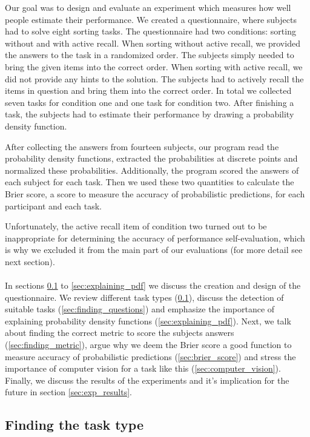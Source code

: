 \documentclass[../main/main.tex]{subfiles}
\begin{document}
	
	\noindent Our goal was to design and evaluate an experiment which measures how well people estimate their performance. We created a questionnaire, where subjects had to solve eight sorting tasks. The questionnaire had two conditions: sorting without and with active recall. When sorting without active recall, we provided the answers to the task in a randomized order. The subjects simply needed to bring the given items into the correct order. When sorting with active recall, we did not provide any hints to the solution. The subjects had to actively recall the items in question and bring them into the correct order. In total we collected seven tasks for condition one and one task for condition two. After finishing a task, the subjects had to estimate their performance by drawing a probability density function. 
	
	After collecting the answers from fourteen subjects, our program read the probability density functions, extracted the probabilities at discrete points and normalized these probabilities. Additionally, the program scored the answers of each subject for each task. Then we used these two quantities to calculate the Brier score, a score to measure the accuracy of probabilistic predictions, for each participant and each task.
	
	Unfortunately, the active recall item of condition two turned out to be inappropriate for determining the accuracy of performance self-evaluation, which is why we excluded it from the main part of our evaluations (for more detail see next section).
	\\\\
	In sections \ref{sec:finding_task_type} to \ref{sec:explaining_pdf} we discuss the creation and design of the questionnaire. We review different task types (\ref{sec:finding_task_type}), discuss the detection of suitable tasks (\ref{sec:finding_questions}) and emphasize the importance of explaining probability density functions (\ref{sec:explaining_pdf}). Next, we talk about finding the correct metric to score the subjects answers (\ref{sec:finding_metric}), argue why we deem the Brier score a good function to measure accuracy of probabilistic predictions (\ref{sec:brier_score}) and stress the importance of computer vision for a task like this (\ref{sec:computer_vision}). Finally, we discuss the results of the experiments and it's implication for the future in section \ref{sec:exp_results}.
	
	\subsection{Finding the task type}
	\label{sec:finding_task_type}
	
\end{document}
